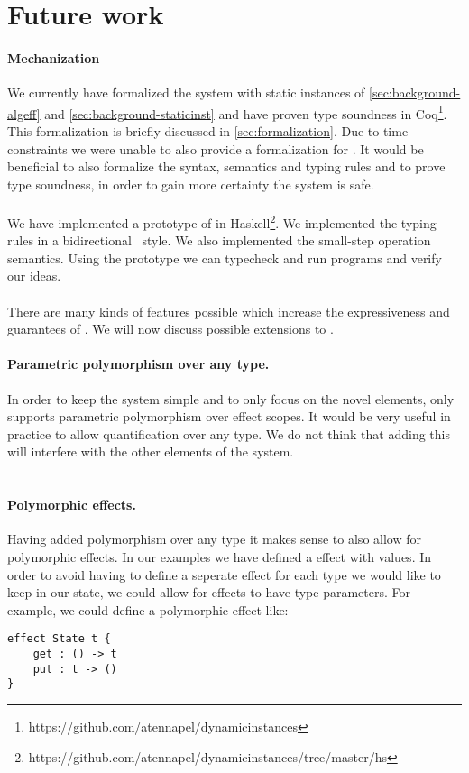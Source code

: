 \section{Future work}

\paragraph{Mechanization}
We currently have formalized the system with static instances of \cref{sec:background-algeff} and \cref{sec:background-staticinst} and have proven type soundness in Coq\footnote{https://github.com/atennapel/dynamicinstances}.
This formalization is briefly discussed in \cref{sec:formalization}.
Due to time constraints we were unable to also provide a formalization for \lang{}.
It would be beneficial to also formalize the syntax, semantics and typing rules \lang{} and to prove type soundness, in order to gain more certainty the system is safe.
\\\\
We have implemented a prototype of \lang{} in Haskell\footnote{https://github.com/atennapel/dynamicinstances/tree/master/hs}.
We implemented the typing rules in a bidirectional~\autocite{bidirectionaltyping} style.
We also implemented the small-step operation semantics.
Using the prototype we can typecheck and run \lang{} programs and verify our ideas.
\\\\
There are many kinds of features possible which increase the expressiveness and guarantees of \lang{}.
We will now discuss possible extensions to \lang{}.

\paragraph{Parametric polymorphism over any type.}
In order to keep the system simple and to only focus on the novel elements, \lang{} only supports parametric polymorphism over effect scopes.
It would be very useful in practice to allow quantification over any type.
We do not think that adding this will interfere with the other elements of the system.
\\\\
\paragraph{Polymorphic effects.}
Having added polymorphism over any type it makes sense to also allow for polymorphic effects.
In our examples we have defined a  effect with  values.
In order to avoid having to define a seperate effect for each type we would like to keep in our state, we could allow for effects to have type parameters.
For example, we could define a polymorphic  effect like:
\begin{verbatim}
effect State t {
	get : () -> t
	put : t -> ()
}
\end{verbatim}

